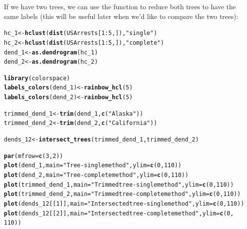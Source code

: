 \documentclass[shortnames,nojss,article]{jss}\usepackage{graphicx, color}
\makeatletter
\newcommand{\hlfunctioncall}[1]{\textcolor[rgb]{0.501960784313725,0,0.329411764705882}{\textbf{#1}}}%
\newcommand{\hlstring}[1]{\textcolor[rgb]{0.6,0.6,1}{#1}}%
\newenvironment{kframe}{%
 \def\at@end@of@kframe{}%
 \ifinner\ifhmode%
  \def\at@end@of@kframe{\end{minipage}}%
  \begin{minipage}{\columnwidth}%
 \fi\fi%
 \def\FrameCommand##1{\hskip\@totalleftmargin \hskip-\fboxsep
 \colorbox{shadecolor}{##1}\hskip-\fboxsep
     \hskip-\linewidth \hskip-\@totalleftmargin \hskip\columnwidth}%
 \MakeFramed {\advance\hsize-\width
   \@totalleftmargin\z@ \linewidth\hsize
   \@setminipage}}%
 {\par\unskip\endMakeFramed%
 \at@end@of@kframe}
\newenvironment{knitrout}{}{} %
\makeatother
\begin{document}
If we have two trees, we can use the  function to reduce both trees to have the same labels (this will be useful later when we'd like to compare the two trees):


\begin{knitrout}
\color{fgcolor}\begin{kframe}
\begin{alltt}

hc_1 <- \hlfunctioncall{hclust}(\hlfunctioncall{dist}(USArrests[1:5, ]), \hlstring{"single"})
hc_2 <- \hlfunctioncall{hclust}(\hlfunctioncall{dist}(USArrests[1:5, ]), \hlstring{"complete"})
dend_1 <- \hlfunctioncall{as.dendrogram}(hc_1)
dend_2 <- \hlfunctioncall{as.dendrogram}(hc_2)

\hlfunctioncall{library}(colorspace)
\hlfunctioncall{labels_colors}(dend_1) <- \hlfunctioncall{rainbow_hcl}(5)
\hlfunctioncall{labels_colors}(dend_2) <- \hlfunctioncall{rainbow_hcl}(5)


trimmed_dend_1 <- \hlfunctioncall{trim}(dend_1, \hlfunctioncall{c}(\hlstring{"Alaska"}))
trimmed_dend_2 <- \hlfunctioncall{trim}(dend_2, \hlfunctioncall{c}(\hlstring{"California"}))

dends_12 <- \hlfunctioncall{intersect_trees}(trimmed_dend_1, trimmed_dend_2)

\hlfunctioncall{par}(mfrow = \hlfunctioncall{c}(3, 2))
\hlfunctioncall{plot}(dend_1, main = \hlstring{"Tree - single method"}, ylim = \hlfunctioncall{c}(0, 110))
\hlfunctioncall{plot}(dend_2, main = \hlstring{"Tree - complete method"}, ylim = \hlfunctioncall{c}(0, 110))
\hlfunctioncall{plot}(trimmed_dend_1, main = \hlstring{"Trimmed tree - single method"}, ylim = \hlfunctioncall{c}(0, 110))
\hlfunctioncall{plot}(trimmed_dend_2, main = \hlstring{"Trimmed tree - complete method"}, ylim = \hlfunctioncall{c}(0, 110))
\hlfunctioncall{plot}(dends_12[[1]], main = \hlstring{"Intersected tree - single method"}, ylim = \hlfunctioncall{c}(0, 110))
\hlfunctioncall{plot}(dends_12[[2]], main = \hlstring{"Intersected tree - complete method"}, ylim = \hlfunctioncall{c}(0, 
    110))
\end{alltt}
\end{kframe}


\end{knitrout}
\end{document}
